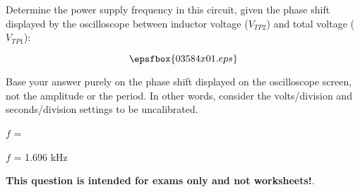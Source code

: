 

Determine the power supply frequency in this circuit, given the phase shift displayed by the oscilloscope between inductor voltage ($V_{TP2}$) and total voltage ($V_{TP1}$):

$$\epsfbox{03584x01.eps}$$

Base your answer purely on the phase shift displayed on the oscilloscope screen, not the amplitude or the period.  In other words, consider the volts/division and seconds/division settings to be uncalibrated.

\vskip 10pt

$f$ = 







$f$ = 1.696 kHz







{\bf This question is intended for exams only and not worksheets!}.



